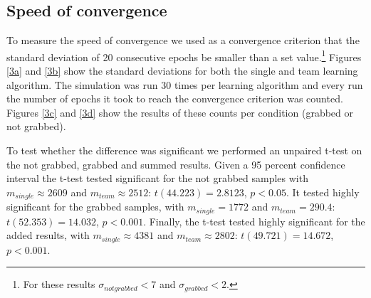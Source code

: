 \subsection{Speed of convergence}
To measure the speed of convergence we used as a convergence criterion that the standard deviation of 20 consecutive epochs be smaller than a set value.\footnote{For these results $\sigma_{not grabbed} < 7$ and $\sigma_{grabbed} < 2$.} Figures \ref{3a} and \ref{3b} show the standard deviations for both the single and team learning algorithm. The simulation was run 30 times per learning algorithm and every run the number of epochs it took to reach the convergence criterion was counted. Figures \ref{3c} and \ref{3d} show the results of these counts per condition (grabbed or not grabbed).

To test whether the difference was significant we performed an unpaired t-test on the not grabbed, grabbed and summed results. Given a 95 percent confidence interval the t-test tested significant for the not grabbed samples with $m_{single} \approx 2609$ and $m_{team} \approx 2512$: $t(44.223) = 2.8123$, $p < 0.05$. It tested highly significant for the grabbed samples, with $m_{single} = 1772$ and $m_{team} = 290.4$: $t(52.353) = 14.032$, $p<0.001$. Finally, the t-test tested highly significant for the added results, with $m_{single} \approx 4381$ and $m_{team} \approx 2802$: $t(49.721) = 14.672$, $p < 0.001$. 
